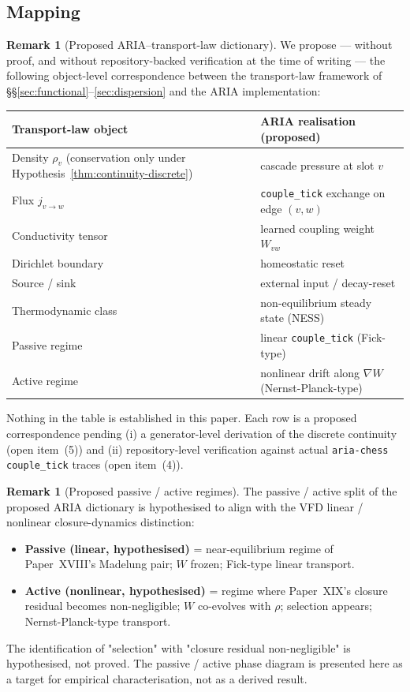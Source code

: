 \documentclass[11pt]{article}
\theoremstyle{definition}
\newtheorem{remark}[theorem]{Remark}
\begin{document}
\subsection{Mapping}

\begin{remark}[Proposed ARIA--transport-law dictionary]\label{prop:aria-dict}
We propose --- without proof, and without repository-backed verification at the time of writing --- the following object-level correspondence between the transport-law framework of \S\S\ref{sec:functional}--\ref{sec:dispersion} and the ARIA implementation:
\begin{center}\small
\begin{tabular}{@{}p{6.0cm}p{8.0cm}@{}}
\toprule
Transport-law object & ARIA realisation (proposed) \\
\midrule
Density $\rho_v$ (conservation only under Hypothesis~\ref{thm:continuity-discrete}) & cascade pressure at slot $v$ \\
Flux $j_{v \to w}$ & \texttt{couple\_tick} exchange on edge $(v, w)$ \\
Conductivity tensor & learned coupling weight $W_{vw}$ \\
Dirichlet boundary & homeostatic reset \\
Source / sink & external input / decay-reset \\
Thermodynamic class & non-equilibrium steady state (NESS) \\
Passive regime & linear \texttt{couple\_tick} (Fick-type) \\
Active regime & nonlinear drift along $\nabla W$ (Nernst-Planck-type) \\
\bottomrule
\end{tabular}
\end{center}
Nothing in the table is established in this paper. Each row is a proposed correspondence pending (i) a generator-level derivation of the discrete continuity (open item~(5)) and (ii) repository-level verification against actual \texttt{aria-chess} \texttt{couple\_tick} traces (open item~(4)).
\end{remark}

\begin{remark}[Proposed passive / active regimes]\label{rem:passive-active}
The passive / active split of the proposed ARIA dictionary is hypothesised to align with the VFD linear / nonlinear closure-dynamics distinction:
\begin{itemize}
    \item \textbf{Passive (linear, hypothesised)} = near-equilibrium regime of Paper~XVIII's Madelung pair; $W$ frozen; Fick-type linear transport.
    \item \textbf{Active (nonlinear, hypothesised)} = regime where Paper~XIX's closure residual becomes non-negligible; $W$ co-evolves with $\rho$; selection appears; Nernst-Planck-type transport.
\end{itemize}
The identification of "selection" with "closure residual non-negligible" is hypothesised, not proved. The passive / active phase diagram is presented here as a target for empirical characterisation, not as a derived result.
\end{remark}
\end{document}
